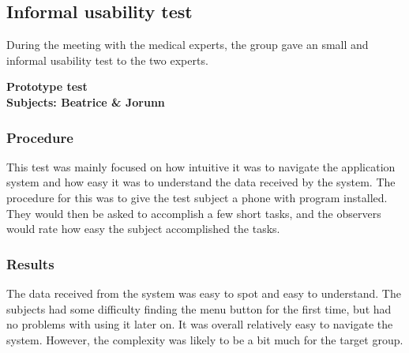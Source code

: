 \subsection{Informal usability test}
During the meeting with the medical experts, the group gave an small and informal usability test to the two experts. 

\textbf{Prototype test}\\
\textbf{Subjects: Beatrice \& Jorunn}
\\

\subsubsection{Procedure}
This test was mainly focused on how intuitive it was to navigate the application system and how easy it was to understand the data received by the system. The procedure for this was to give the test subject a phone with program installed. They would then be asked to accomplish a few short tasks, and the observers would rate how easy the subject accomplished the tasks. 

\subsubsection{Results}
The data received from the system was easy to spot and easy to understand. The subjects had some difficulty finding the menu button for the first time, but had no problems with using it later on. It was overall relatively easy to navigate the system. However, the complexity was likely to be a bit much for the target group.